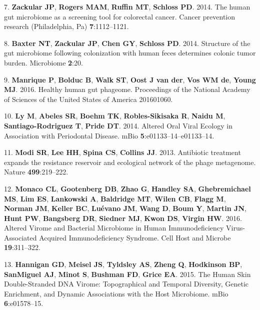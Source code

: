 \documentclass[12pt,]{article}
\begin{document}
\hypertarget{ref-Zackular:2014fba}{}
7. \textbf{Zackular JP}, \textbf{Rogers MAM}, \textbf{Ruffin MT},
\textbf{Schloss PD}. 2014. The human gut microbiome as a screening tool
for colorectal cancer. Cancer prevention research (Philadelphia, Pa)
\textbf{7}:1112--1121.

\hypertarget{ref-Baxter:2014hb}{}
8. \textbf{Baxter NT}, \textbf{Zackular JP}, \textbf{Chen GY},
\textbf{Schloss PD}. 2014. Structure of the gut microbiome following
colonization with human feces determines colonic tumor burden.
Microbiome \textbf{2}:20.

\hypertarget{ref-Manrique:2016dx}{}
9. \textbf{Manrique P}, \textbf{Bolduc B}, \textbf{Walk ST},
\textbf{Oost J van der}, \textbf{Vos WM de}, \textbf{Young MJ}. 2016.
Healthy human gut phageome. Proceedings of the National Academy of
Sciences of the United States of America 201601060.

\hypertarget{ref-Ly:2014ew}{}
10. \textbf{Ly M}, \textbf{Abeles SR}, \textbf{Boehm TK},
\textbf{Robles-Sikisaka R}, \textbf{Naidu M}, \textbf{Santiago-Rodriguez
T}, \textbf{Pride DT}. 2014. Altered Oral Viral Ecology in Association
with Periodontal Disease. mBio \textbf{5}:e01133--14--e01133--14.

\hypertarget{ref-Modi:2013fia}{}
11. \textbf{Modi SR}, \textbf{Lee HH}, \textbf{Spina CS},
\textbf{Collins JJ}. 2013. Antibiotic treatment expands the resistance
reservoir and ecological network of the phage metagenome. Nature
\textbf{499}:219--222.

\hypertarget{ref-Monaco:2016ita}{}
12. \textbf{Monaco CL}, \textbf{Gootenberg DB}, \textbf{Zhao G},
\textbf{Handley SA}, \textbf{Ghebremichael MS}, \textbf{Lim ES},
\textbf{Lankowski A}, \textbf{Baldridge MT}, \textbf{Wilen CB},
\textbf{Flagg M}, \textbf{Norman JM}, \textbf{Keller BC},
\textbf{Luévano JM}, \textbf{Wang D}, \textbf{Boum Y}, \textbf{Martin
JN}, \textbf{Hunt PW}, \textbf{Bangsberg DR}, \textbf{Siedner MJ},
\textbf{Kwon DS}, \textbf{Virgin HW}. 2016. Altered Virome and Bacterial
Microbiome in Human Immunodeficiency Virus-Associated Acquired
Immunodeficiency Syndrome. Cell Host and Microbe \textbf{19}:311--322.

\hypertarget{ref-Hannigan:2015fz}{}
13. \textbf{Hannigan GD}, \textbf{Meisel JS}, \textbf{Tyldsley AS},
\textbf{Zheng Q}, \textbf{Hodkinson BP}, \textbf{SanMiguel AJ},
\textbf{Minot S}, \textbf{Bushman FD}, \textbf{Grice EA}. 2015. The
Human Skin Double-Stranded DNA Virome: Topographical and Temporal
Diversity, Genetic Enrichment, and Dynamic Associations with the Host
Microbiome. mBio \textbf{6}:e01578--15.
\end{document}
